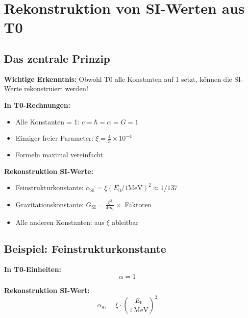 	\section{Rekonstruktion von SI-Werten aus T0}
	\label{sec:si_reconstruction}
	
	\subsection{Das zentrale Prinzip}
	
	\textbf{Wichtige Erkenntnis:} Obwohl T0 alle Konstanten auf 1 setzt, können die SI-Werte rekonstruiert werden!
	
	\begin{tcolorbox}[colback=green!5!white,colframe=green!75!black,title=T0-Rekonstruktion]
		\textbf{In T0-Rechnungen:}
		\begin{itemize}
			\item Alle Konstanten = 1: $c = \hbar = \alpha = G = 1$
			\item Einziger freier Parameter: $\xi = \frac{4}{3} \times 10^{-4}$
			\item Formeln maximal vereinfacht
		\end{itemize}
		
		\textbf{Rekonstruktion SI-Werte:}
		\begin{itemize}
			\item Feinstrukturkonstante: $\alpha_{\text{SI}} = \xi(E_0/1\text{MeV})^2 \approx 1/137$
			\item Gravitationskonstante: $G_{\text{SI}} = \frac{\xi^2}{4m_e} \times$ Faktoren
			\item Alle anderen Konstanten: aus $\xi$ ableitbar
		\end{itemize}
	\end{tcolorbox}
	
	\subsection{Beispiel: Feinstrukturkonstante}
	
	\textbf{In T0-Einheiten:}
	\begin{equation}
		\alpha = 1
	\end{equation}
	
	\textbf{Rekonstruktion SI-Wert:}
	\begin{equation}
		\alpha_{\text{SI}} = \xi \cdot \left(\frac{E_0}{1\,\text{MeV}}\right)^2
	\end{equation}
	

